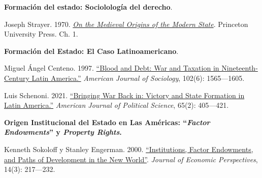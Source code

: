 \documentclass[letterpaper]{article}
\renewenvironment{itemize}{
  \begin{list}{}{
    \setlength{\leftmargin}{1.5em}
  }
}{
  \end{list}
}
\begin{document}
\begin{enumerate}[label=\roman*.]
\begin{itemize}
			\item[3.] {\bf Formaci\'on del estado: Sociololog\'ia del derecho}.
				\begin{itemize} 
					\item[$\circ$] Joseph Strayer. 1970. \href{https://github.com/hbahamonde/Ciencia_Politica_II/raw/master/Readings/Strayer.pdf}{\emph{On the Medieval Origins of the Modern State}}. Princeton University Press. Ch. 1.
				\end{itemize}

			\item[4.] {\bf Formaci\'on del Estado: El Caso Latinoamericano}.
				\begin{itemize}
					\item[$\circ$] Miguel \'Angel Centeno. 1997. \href{https://github.com/hbahamonde/Ciencia_Politica_II/raw/master/Readings/Centeno.pdf}{``Blood and Debt: War and Taxation in Nineteenth-Century Latin America.''} \emph{American Journal of Sociology}, 102(6): 1565---1605. 

					\item[$\circ$] Luis Schenoni. 2021. \href{https://github.com/hbahamonde/Ciencia_Politica_II/raw/master/Readings/Schenoni.pdf}{``Bringing War Back in: Victory and State Formation in Latin America.''} \emph{American Journal of Political Science}, 65(2): 405---421. 
					
				\end{itemize}

		\item[5.] {\bf Origen Institucional del Estado en Las Am\'ericas: ``\emph{Factor Endowments}'' y \emph{Property Rights}.}
				\begin{itemize}
					\item[$\circ$] Kenneth Sokoloff y Stanley Engerman. 2000. \href{https://github.com/hbahamonde/Ciencia_Politica_II/raw/master/Readings/Sokoloff_Engerman.pdf}{``Institutions, Factor Endowments, and Paths of Development in the New World''}. \emph{Journal of Economic Perspectives}, 14(3): 217---232. 
					

\end{itemize}
\end{itemize}
\end{enumerate}
\end{document}
